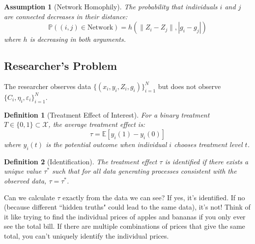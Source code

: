 \documentclass{article}
\newtheorem{definition}{Definition}
\newtheorem{assumption}{Assumption}
\newcommand{\E}{\mathbb{E}}
\renewcommand{\Pr}{\mathbb{P}}
\newcommand{\X}{\mathcal{X}}
\begin{document}
\begin{assumption}[Network Homophily]
\label{ass:homophily}
The probability that individuals $i$ and $j$ are connected decreases in their distance:
\begin{equation}
\Pr((i,j) \in \text{Network}) = h(\|Z_i - Z_j\|, |g_i - g_j|) %
\end{equation}
where $h$ is decreasing in both arguments.
\end{assumption}

\subsection{Researcher's Problem}

The researcher observes data $\{(x_i, y_i, Z_i, g_i)\}_{i=1}^N$ but does not observe $\{C_i, \eta_i, \varepsilon_i\}_{i=1}^N$.

\begin{definition}[Treatment Effect of Interest]
For a binary treatment $T \in \{0,1\} \subset \X$, the average treatment effect is:
\begin{equation}
\tau = \E[y_i(1) - y_i(0)] %
\end{equation}
where $y_i(t)$ is the potential outcome when individual $i$ chooses treatment level $t$.
\end{definition}

\begin{definition}[Identification]
The treatment effect $\tau$ is \textit{identified} if there exists a unique value $\tau^*$ such that for all data generating processes consistent with the observed data, $\tau = \tau^*$.
\end{definition}

\begin{tcolorbox}[mycommentbox,title=understanding identification]
Can we calculate $\tau$ exactly from the data we can see? If yes, it's identified. If no (because different ``hidden truths" could lead to the same data), it's not! Think of it like trying to find the individual prices of apples and bananas if you only ever see the total bill. If there are multiple combinations of prices that give the same total, you can't uniquely identify the individual prices.
\end{tcolorbox}
\end{document}
